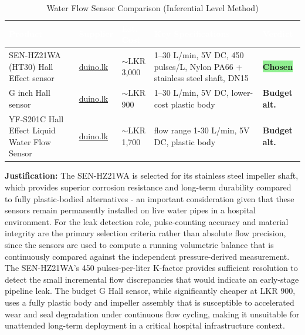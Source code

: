 \documentclass[12pt,a4paper]{article}
\newcommand{\badgegreen}[1]{%
  \colorbox{lightgreen}{\textcolor{badgegreen}{\footnotesize\textbf{#1}}}%
}
\newcommand{\badgeamber}[1]{%
  \colorbox{lightamber}{\textcolor{badgeamber}{\footnotesize\textbf{#1}}}%
}
\begin{document}
\begin{table}[H]
\centering
\setlength{\tabcolsep}{5pt}
\renewcommand{\arraystretch}{1.4}
\begin{tabular}{|p{3.2cm}|p{3.5cm}|p{2.2cm}|p{3.5cm}|p{2cm}|}
\hline
\rowcolor{headerblue}
\textcolor{white}{\textbf{Product}} &
\textcolor{white}{\textbf{Supplier}} &
\textcolor{white}{\textbf{Est. Cost}} &
\textcolor{white}{\textbf{Key Specifications}} &
\textcolor{white}{\textbf{Verdict}} \\
\hline
\rowcolor{chosen}
SEN-HZ21WA (HT30) Hall Effect sensor &
\href{https://www.duino.lk/product/ht30-water-flow-sensor-ac/}{duino.lk} &
$\sim$LKR 3,000 &
1--30 L/min, 5V DC, 450 pulses/L, Nylon PA66 + stainless steel shaft, DN15 &
\badgegreen{Chosen} \\
\hline
G\textonehalf{} inch Hall sensor &
\href{https://www.duino.lk/product/g0-5-inch-water-flow-hall-sensor/}{duino.lk} &
$\sim$LKR 900 &
1--30 L/min, 5V DC, lower-cost plastic body &
\badgeamber{Budget alt.} \\
\hline
YF-S201C Hall Effect Liquid Water Flow Sensor&
\href{https://www.duino.lk/product/yf-s201c-g1-2-hall-effect-liquid-water-flow-sensor/}{duino.lk} &
$\sim$LKR 1,700 &
flow range 1-30 L/min, 5V DC, plastic body &
\badgeamber{Budget alt.} \\
\hline
\end{tabular}
\caption{Water Flow Sensor Comparison (Inferential Level Method)}
\end{table}

\noindent\textbf{Justification:} The SEN-HZ21WA is selected for its stainless steel impeller shaft, which provides superior corrosion resistance and long-term durability compared to fully plastic-bodied alternatives - an important consideration given that these sensors remain permanently installed on live water pipes in a hospital environment. For the leak detection role, pulse-counting accuracy and material integrity are the primary selection criteria rather than absolute flow precision, since the sensors are used to compute a running volumetric balance that is continuously compared against the independent pressure-derived measurement. The SEN-HZ21WA's 450 pulses-per-liter K-factor provides sufficient resolution to detect the small incremental flow discrepancies that would indicate an early-stage pipeline leak. The budget G\textonehalf{} Hall sensor, while significantly cheaper at LKR 900, uses a fully plastic body and impeller assembly that is susceptible to accelerated wear and seal degradation under continuous flow cycling, making it unsuitable for unattended long-term deployment in a critical hospital infrastructure context.
\end{document}
